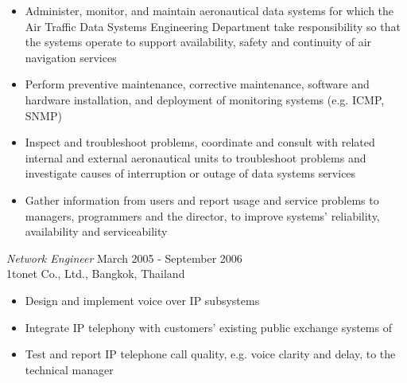 \documentclass{res}
\begin{document}
\begin{resume}
\begin{itemize} \itemsep -2pt %
   \item Administer, monitor, and maintain aeronautical data systems for which the Air Traffic Data Systems Engineering Department take responsibility so that the systems operate to support availability, safety and continuity of air navigation services
   \item Perform preventive maintenance, corrective maintenance, software and hardware installation, and deployment of monitoring systems (e.g. ICMP, SNMP)
   \item Inspect and troubleshoot problems, coordinate and consult with related internal and external aeronautical units to troubleshoot problems and investigate causes of interruption or outage of data systems services
   \item Gather information from users and report usage and service problems to managers, programmers and the director, to improve systems' reliability, availability and serviceability
 \end{itemize}
 
{\sl Network Engineer} \hfill                  March 2005 - September 2006 \\
1tonet Co., Ltd., Bangkok, Thailand
  \begin{itemize} \itemsep -2pt
  \item Design and implement voice over IP subsystems
 \item  Integrate IP telephony with customers' existing public exchange systems of 
 \item  Test and report IP telephone call quality, e.g. voice clarity and delay, to the technical manager
 \end{itemize}
 
 \newpage

\end{resume}
\end{document}
